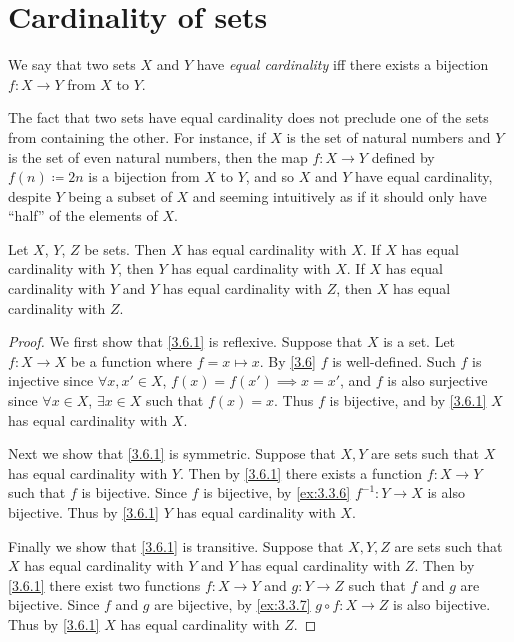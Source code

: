 \section{Cardinality of sets}\label{sec:3.6}

\begin{defn}\label{3.6.1}
	We say that two sets \(X\) and \(Y\) have \emph{equal cardinality} iff there exists a bijection \(f : X \to Y\) from \(X\) to \(Y\).
\end{defn}

\setcounter{thm}{2}
\begin{rmk}\label{3.6.3}
	The fact that two sets have equal cardinality does not preclude one of the sets from containing the other.
	For instance, if \(X\) is the set of natural numbers and \(Y\) is the set of even natural numbers, then the map \(f : X \to Y\) defined by \(f(n) \coloneqq 2n\) is a bijection from \(X\) to \(Y\), and so \(X\) and \(Y\) have equal cardinality, despite \(Y\) being a subset of \(X\) and seeming intuitively as if it should only have ``half'' of the elements of \(X\).
\end{rmk}

\begin{prop}\label{3.6.4}
	Let \(X\), \(Y\), \(Z\) be sets.
	Then \(X\) has equal cardinality with \(X\).
	If \(X\) has equal cardinality with \(Y\), then \(Y\) has equal cardinality with \(X\).
	If \(X\) has equal cardinality with \(Y\) and \(Y\) has equal cardinality with \(Z\), then \(X\) has equal cardinality with \(Z\).
\end{prop}

\begin{proof}
	We first show that \cref{3.6.1} is reflexive.
	Suppose that \(X\) is a set.
	Let \(f : X \to X\) be a function where \(f = x \mapsto x\).
	By \cref{3.6} \(f\) is well-defined.
	Such \(f\) is injective since \(\forall x, x' \in X\), \(f(x) = f(x') \implies x = x'\), and \(f\) is also surjective since \(\forall x \in X\), \(\exists x \in X\) such that \(f(x) = x\).
	Thus \(f\) is bijective, and by \cref{3.6.1} \(X\) has equal cardinality with \(X\).

	Next we show that \cref{3.6.1} is symmetric.
	Suppose that \(X, Y\) are sets such that \(X\) has equal cardinality with \(Y\).
	Then by \cref{3.6.1} there exists a function \(f : X \to Y\) such that \(f\) is bijective.
	Since \(f\) is bijective, by \cref{ex:3.3.6} \(f^{-1} : Y \to X\) is also bijective.
	Thus by \cref{3.6.1} \(Y\) has equal cardinality with \(X\).

	Finally we show that \cref{3.6.1} is transitive.
	Suppose that \(X, Y, Z\) are sets such that \(X\) has equal cardinality with \(Y\) and \(Y\) has equal cardinality with \(Z\).
	Then by \cref{3.6.1} there exist two functions \(f : X \to Y\) and \(g : Y \to Z\) such that \(f\) and \(g\) are bijective.
	Since \(f\) and \(g\) are bijective, by \cref{ex:3.3.7} \(g \circ f : X \to Z\) is also bijective.
	Thus by \cref{3.6.1} \(X\) has equal cardinality with \(Z\).
\end{proof}


